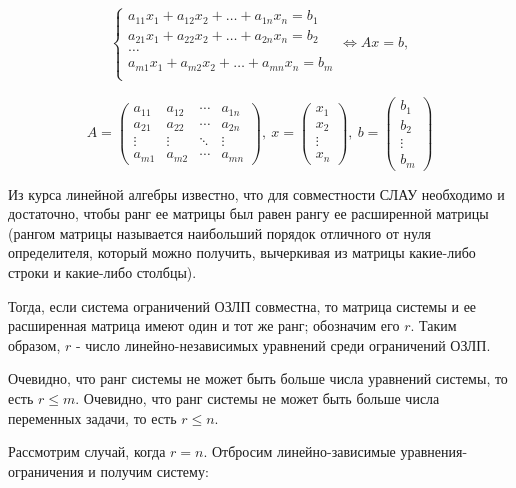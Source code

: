 \documentclass[a4paper,12pt]{report}
\begin{document}
\begin{align*}
\begin{cases}
a_{11}x_{1} + a_{12}x_{2} + \ldots + a_{1n}x_{n} = b_{1} \\
a_{21}x_{1} + a_{22}x_{2} + \ldots + a_{2n}x_{n} = b_{2} \\
\ldots \\
a_{m1}x_{1} + a_{m2}x_{2} + \ldots + a_{mn}x_{n} = b_{m} \\
\end{cases}	
\Longleftrightarrow Ax = b,
\end{align*}

\begin{equation*}
A = \begin{pmatrix}
a_{11} & a_{12} & \cdots & a_{1n} \\
a_{21} & a_{22} & \cdots & a_{2n} \\        
\vdots & \vdots & \ddots & \vdots \\
a_{m1} & a_{m2} & \cdots & a_{mn}
\end{pmatrix},\ x = \begin{pmatrix}
x_{1} \\
x_{2} \\        
\vdots \\
x_{n}
\end{pmatrix},\ b = \begin{pmatrix}
b_{1} \\
b_{2} \\        
\vdots \\
b_{m}
\end{pmatrix}
\end{equation*}

Из курса линейной алгебры известно, что для совместности СЛАУ необходимо и достаточно, чтобы ранг ее матрицы был равен рангу ее расширенной матрицы (рангом матрицы называется наибольший порядок отличного от нуля определителя, который можно получить, вычеркивая из матрицы какие-либо строки и какие-либо столбцы).

Тогда, если система ограничений ОЗЛП совместна, то матрица системы и ее расширенная матрица имеют один и тот же ранг; обозначим его $r$. Таким образом, $r$ - число линейно-независимых уравнений среди ограничений ОЗЛП.

Очевидно, что ранг системы не может быть больше числа уравнений системы, то есть $r \leq m$. Очевидно, что ранг системы не может быть больше числа переменных задачи, то есть $r \leq n$.

Рассмотрим случай, когда $r = n$. Отбросим линейно-зависимые уравнения-ограничения и получим систему:
\end{document}
